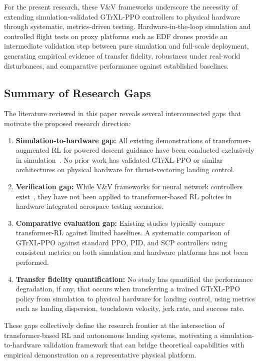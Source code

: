 \documentclass[10pt,twocolumn]{article}
\begin{document}
For the present research, these V\&V frameworks underscore the necessity of extending simulation-validated GTrXL-PPO controllers to physical hardware through systematic, metrics-driven testing.
Hardware-in-the-loop simulation and controlled flight tests on proxy platforms such as EDF drones provide an intermediate validation step between pure simulation and full-scale deployment, generating empirical evidence of transfer fidelity, robustness under real-world disturbances, and comparative performance against established baselines.

\subsection{Summary of Research Gaps}

The literature reviewed in this paper reveals several interconnected gaps that motivate the proposed research direction:

\begin{enumerate}
    \item \textbf{Simulation-to-hardware gap:} All existing demonstrations of transformer-augmented RL for powered descent guidance have been conducted exclusively in simulation~\cite{federici2024, carradori2025, chen2024}.
    No prior work has validated GTrXL-PPO or similar architectures on physical hardware for thrust-vectoring landing control.
    \item \textbf{Verification gap:} While V\&V frameworks for neural network controllers exist~\cite{luckall2002, zhang2020}, they have not been applied to transformer-based RL policies in hardware-integrated aerospace testing scenarios.
    \item \textbf{Comparative evaluation gap:} Existing studies typically compare transformer-RL against limited baselines.
    A systematic comparison of GTrXL-PPO against standard PPO, PID, and SCP controllers using consistent metrics on both simulation and hardware platforms has not been performed.
    \item \textbf{Transfer fidelity quantification:} No study has quantified the performance degradation, if any, that occurs when transferring a trained GTrXL-PPO policy from simulation to physical hardware for landing control, using metrics such as landing dispersion, touchdown velocity, jerk rate, and success rate.
\end{enumerate}

These gaps collectively define the research frontier at the intersection of transformer-based RL and autonomous landing systems, motivating a simulation-to-hardware validation framework that can bridge theoretical capabilities with empirical demonstration on a representative physical platform.
\end{document}
